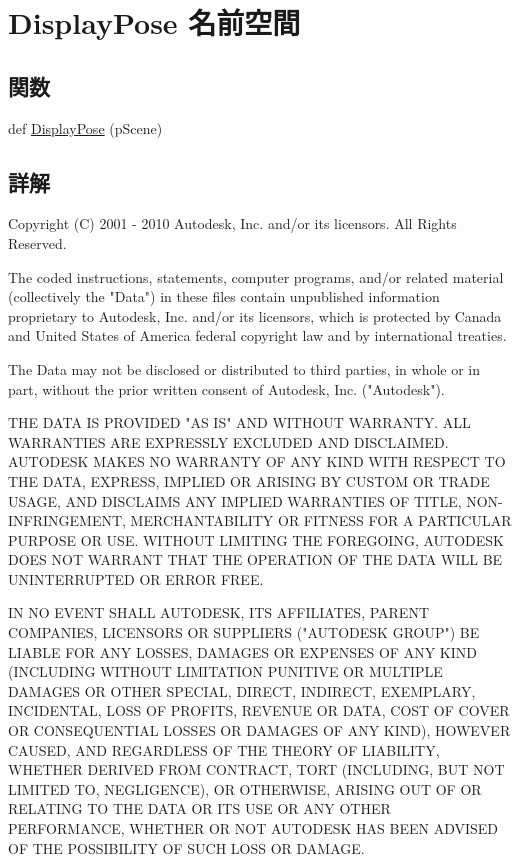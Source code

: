\hypertarget{namespace_display_pose}{}\section{Display\+Pose 名前空間}
\label{namespace_display_pose}
\subsection*{関数}
\begin{DoxyCompactItemize}
\item 
def \hyperlink{namespace_display_pose_aa6ef9e7862b03171ee746def2ae1da08}{Display\+Pose} (p\+Scene)
\end{DoxyCompactItemize}


\subsection{詳解}
\begin{DoxyVerb} Copyright (C) 2001 - 2010 Autodesk, Inc. and/or its licensors.
 All Rights Reserved.

 The coded instructions, statements, computer programs, and/or related material 
 (collectively the "Data") in these files contain unpublished information 
 proprietary to Autodesk, Inc. and/or its licensors, which is protected by 
 Canada and United States of America federal copyright law and by international 
 treaties. 
 
 The Data may not be disclosed or distributed to third parties, in whole or in
 part, without the prior written consent of Autodesk, Inc. ("Autodesk").

 THE DATA IS PROVIDED "AS IS" AND WITHOUT WARRANTY.
 ALL WARRANTIES ARE EXPRESSLY EXCLUDED AND DISCLAIMED. AUTODESK MAKES NO
 WARRANTY OF ANY KIND WITH RESPECT TO THE DATA, EXPRESS, IMPLIED OR ARISING
 BY CUSTOM OR TRADE USAGE, AND DISCLAIMS ANY IMPLIED WARRANTIES OF TITLE, 
 NON-INFRINGEMENT, MERCHANTABILITY OR FITNESS FOR A PARTICULAR PURPOSE OR USE. 
 WITHOUT LIMITING THE FOREGOING, AUTODESK DOES NOT WARRANT THAT THE OPERATION
 OF THE DATA WILL BE UNINTERRUPTED OR ERROR FREE. 
 
 IN NO EVENT SHALL AUTODESK, ITS AFFILIATES, PARENT COMPANIES, LICENSORS
 OR SUPPLIERS ("AUTODESK GROUP") BE LIABLE FOR ANY LOSSES, DAMAGES OR EXPENSES
 OF ANY KIND (INCLUDING WITHOUT LIMITATION PUNITIVE OR MULTIPLE DAMAGES OR OTHER
 SPECIAL, DIRECT, INDIRECT, EXEMPLARY, INCIDENTAL, LOSS OF PROFITS, REVENUE
 OR DATA, COST OF COVER OR CONSEQUENTIAL LOSSES OR DAMAGES OF ANY KIND),
 HOWEVER CAUSED, AND REGARDLESS OF THE THEORY OF LIABILITY, WHETHER DERIVED
 FROM CONTRACT, TORT (INCLUDING, BUT NOT LIMITED TO, NEGLIGENCE), OR OTHERWISE,
 ARISING OUT OF OR RELATING TO THE DATA OR ITS USE OR ANY OTHER PERFORMANCE,
 WHETHER OR NOT AUTODESK HAS BEEN ADVISED OF THE POSSIBILITY OF SUCH LOSS
 OR DAMAGE. \end{DoxyVerb}
 

